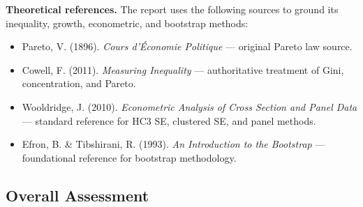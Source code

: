 \documentclass[a4paper,10pt]{article}
\begin{document}
\medskip

\textbf{Theoretical references.} The report uses the following sources to ground its inequality, growth, econometric, and bootstrap methods:
\begin{itemize}
  \item Pareto, V. (1896). \textit{Cours d'Économie Politique} --- original Pareto law source.
  \item Cowell, F. (2011). \textit{Measuring Inequality} --- authoritative treatment of Gini, concentration, and Pareto.
  \item Wooldridge, J. (2010). \textit{Econometric Analysis of Cross Section and Panel Data} --- standard reference for HC3 SE, clustered SE, and panel methods.
  \item Efron, B. \& Tibshirani, R. (1993). \textit{An Introduction to the Bootstrap} --- foundational reference for bootstrap methodology.
\end{itemize}

\subsection{Overall Assessment}
\end{document}
